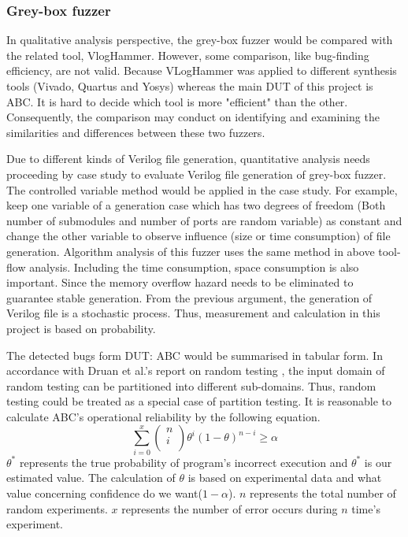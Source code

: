 \subsubsection{Grey-box fuzzer}
In qualitative analysis perspective, the grey-box fuzzer would be compared with the related tool,  VlogHammer. However, some comparison, like bug-finding efficiency, are not valid. Because VLogHammer was applied to different synthesis tools (Vivado, Quartus and Yosys) whereas the main DUT of this project is ABC. It is hard to decide which tool is more "efficient" than the other. Consequently, the comparison may conduct on identifying and examining the similarities and differences between these two fuzzers.

Due to different kinds of Verilog file generation, quantitative analysis needs proceeding by case study to evaluate Verilog file generation of grey-box fuzzer. The controlled variable method would be applied in the case study. For example, keep one variable of a generation case which has two degrees of freedom (Both number of submodules and number of ports are random variable)\label{two degree} as constant and change the other variable to observe influence (size or time consumption) of file generation. Algorithm analysis of this fuzzer uses the same method in above tool-flow analysis. Including the time consumption, space consumption is also important. Since the memory overflow hazard needs to be eliminated to guarantee stable generation. From the previous argument, the generation of Verilog file is a stochastic process. Thus, measurement and calculation in this project is based on probability. \label{prob}

The detected bugs form DUT: ABC would be summarised in tabular form. In accordance with Druan et al.'s report on random testing \cite{duran1981report}, the input domain of random testing can be partitioned into different sub-domains. Thus, random testing could be treated as a special case of partition testing. It is reasonable to calculate ABC's operational reliability by the following equation.
\begin{equation}
       \sum_{i=0}^{x} 
       \begin{pmatrix}
       n\\
       i\\
       \end{pmatrix}
       \theta^{i}(1-\theta)^{n-i}\ge\alpha
\end{equation}
$\theta^{*}$ represents the true probability of program's incorrect execution and $\theta^{*}$ is our estimated value. The calculation of $\theta$ is based on experimental data and what value concerning confidence do we want($1-\alpha$). $n$ represents the total number of random experiments. $x$ represents the number of error occurs during $n$ time's experiment. 

